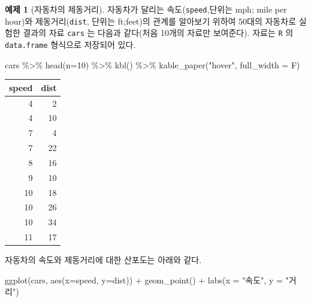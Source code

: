 \documentclass[
]{book}
\newenvironment{Shaded}{\begin{snugshade}}{\end{snugshade}}
\newcommand{\AttributeTok}[1]{\textcolor[rgb]{0.77,0.63,0.00}{#1}}
\newcommand{\DecValTok}[1]{\textcolor[rgb]{0.00,0.00,0.81}{#1}}
\newcommand{\FunctionTok}[1]{\textcolor[rgb]{0.00,0.00,0.00}{#1}}
\newcommand{\NormalTok}[1]{#1}
\newcommand{\SpecialCharTok}[1]{\textcolor[rgb]{0.00,0.00,0.00}{#1}}
\newcommand{\StringTok}[1]{\textcolor[rgb]{0.31,0.60,0.02}{#1}}
\theoremstyle{definition}
\theoremstyle{definition}
\newtheorem{example}{예제}[chapter]
\theoremstyle{definition}
\theoremstyle{definition}
\theoremstyle{remark}
\begin{document}
\begin{example}[자동차의 제동거리]
\protect\hypertarget{exm:unnamed-chunk-4}{}{\label{exm:unnamed-chunk-4} {} }
자동차가 달리는 속도(\texttt{speed},단위는 mph; mile per hour)와 제동거리(\texttt{dist}, 단위는 ft;feet)의 관계를 알아보기 위하여 50대의 자동차로 실험한 결과의 자료 \texttt{cars} 는 다음과 같다(처음 10개의 자료만 보여준다). 자료는 \texttt{R} 의 \texttt{data.frame} 형식으로 저장되어 있다.
\end{example}

\begin{Shaded}
\begin{Highlighting}[]
\NormalTok{cars }\SpecialCharTok{\%\textgreater{}\%} \FunctionTok{head}\NormalTok{(}\AttributeTok{n=}\DecValTok{10}\NormalTok{) }\SpecialCharTok{\%\textgreater{}\%} \FunctionTok{kbl}\NormalTok{() }\SpecialCharTok{\%\textgreater{}\%}  \FunctionTok{kable\_paper}\NormalTok{(}\StringTok{"hover"}\NormalTok{, }\AttributeTok{full\_width =}\NormalTok{ F)}
\end{Highlighting}
\end{Shaded}

\begin{table}
\centering
\begin{tabular}[t]{r|r}
\hline
speed & dist\\
\hline
4 & 2\\
\hline
4 & 10\\
\hline
7 & 4\\
\hline
7 & 22\\
\hline
8 & 16\\
\hline
9 & 10\\
\hline
10 & 18\\
\hline
10 & 26\\
\hline
10 & 34\\
\hline
11 & 17\\
\hline
\end{tabular}
\end{table}

자동차의 속도와 제동거리에 대한 산포도는 아래와 같다.

\begin{Shaded}
\begin{Highlighting}[]
\FunctionTok{ggplot}\NormalTok{(cars, }\FunctionTok{aes}\NormalTok{(}\AttributeTok{x=}\NormalTok{speed, }\AttributeTok{y=}\NormalTok{dist)) }\SpecialCharTok{+} \FunctionTok{geom\_point}\NormalTok{() }\SpecialCharTok{+} \FunctionTok{labs}\NormalTok{(}\AttributeTok{x =} \StringTok{"속도"}\NormalTok{, }\AttributeTok{y =} \StringTok{"거리"}\NormalTok{)}
\end{Highlighting}
\end{Shaded}
\end{document}

